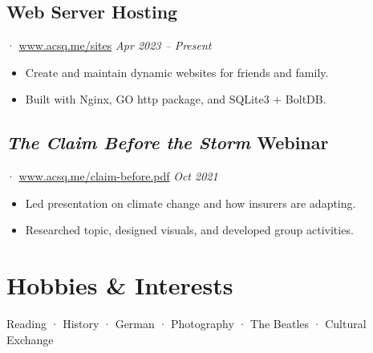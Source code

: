 \documentclass[12pt]{article}
\newcommand{\itemspace}{\vspace{0.3170em}}
\renewcommand{\textsc}[1]{\uppercase{\footnotesize#1}\normalsize}
\begin{document}
\itemspace

\subsection{Web Server Hosting} ·
\href{https://www.acsq.me/sites}{www.acsq.me/sites}
\hfill \textit{Apr 2023 -- Present}

\begin{itemize}[noitemsep,nolistsep]
  \item Create and maintain dynamic websites for friends and family.

  \item Built with Nginx, \textsc{go} http package, and SQLite3 + BoltDB.
\end{itemize}

\itemspace

\subsection{\textit{The Claim Before the Storm} Webinar}
· \href{https://www.acsq.me/claim-before.pdf}{www.acsq.me/claim-before.pdf}
\hfill \textit{Oct 2021}

\begin{itemize}[noitemsep,nolistsep]
  \item Led presentation on climate change and how insurers are adapting.

  \item Researched topic, designed visuals, and developed group activities.
\end{itemize}

\itemspace

\section{Hobbies \& Interests}

Reading · History · German · Photography · The Beatles · Cultural Exchange
\end{document}

